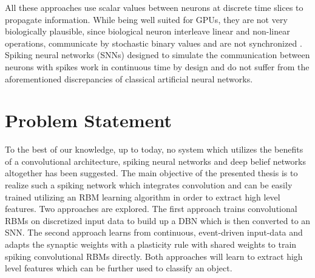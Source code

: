 All these approaches use scalar values between neurons at discrete time slices to propagate information. 
While being well suited for GPUs, they are not very biologically plausible, since biological neuron interleave linear and non-linear operations, communicate by stochastic binary values and are not synchronized \cite{bengio2015towards}. 
Spiking neural networks (SNNs) designed to simulate the communication between neurons with spikes work in continuous time by design and do not suffer from the aforementioned discrepancies of classical artificial neural networks.

\section{Problem Statement} \label{c:probstate}

To the best of our knowledge, up to today, no system which utilizes the benefits of a convolutional architecture, spiking neural networks and deep belief networks altogether has been suggested. 
The main objective of the presented thesis is to realize such a spiking network which integrates convolution and can be easily trained utilizing an RBM learning algorithm in order to extract high level features. 
Two approaches are explored. 
The first approach trains convolutional RBMs on discretized input data to build up a DBN which is then converted to an SNN. 
The second approach learns from continuous, event-driven input-data and adapts the synaptic weights with a plasticity rule with shared weights to train spiking convolutional RBMs directly. 
Both approaches will learn to extract high level features which can be further used to classify an object. 

%
%
%


